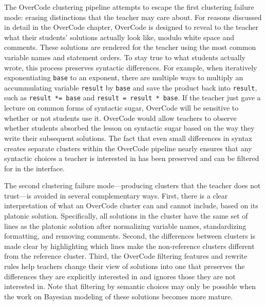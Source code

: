 The OverCode clustering pipeline attempts to escape the first clustering failure mode: erasing distinctions that the teacher may care about. For reasons discussed in detail in the OverCode chapter, OverCode is designed to reveal to the teacher what their students' solutions actually look like, modulo white space and comments. These solutions are rendered for the teacher using the most common variable names and statement orders. To stay true to what students actually wrote, this process preserves syntactic differences. For example, when iteratively exponentiating \texttt{base} to an exponent, there are multiple ways to multiply an accummulating variable \texttt{result} by \texttt{base} and save the product back into \texttt{result}, such as \texttt{result *= base} and \texttt{result = result * base}. If the teacher just gave a lecture on common forms of syntactic sugar, OverCode will be sensitive to whether or not students use it. OverCode would allow teachers to observe whether students absorbed the lesson on syntactic sugar based on the way they write their subsequent solutions. The fact that even small differences in syntax creates separate clusters within the OverCode pipeline nearly ensures that any syntactic choices a teacher is interested in has been preserved and can be filtered for in the interface.



The second clustering failure mode---producing clusters that the teacher does not trust---is avoided in several complementary ways. First, there is a clear interpretation of what an OverCode cluster can and cannot include, based on its platonic solution. Specifically, all solutions in the cluster have the same set of lines as the platonic solution after normalizing variable names, standardizing formatting, and removing comments. Second, the differences between clusters is made clear by highlighting which lines make the non-reference clusters different from the reference cluster. Third, the OverCode filtering features and rewrite rules help teachers change their view of solutions into one that preserves the differences they are explicitly interested in and ignores those they are not interested in. Note that filtering by semantic choices may only be possible when the work on Bayesian modeling of these solutions becomes more mature. 


